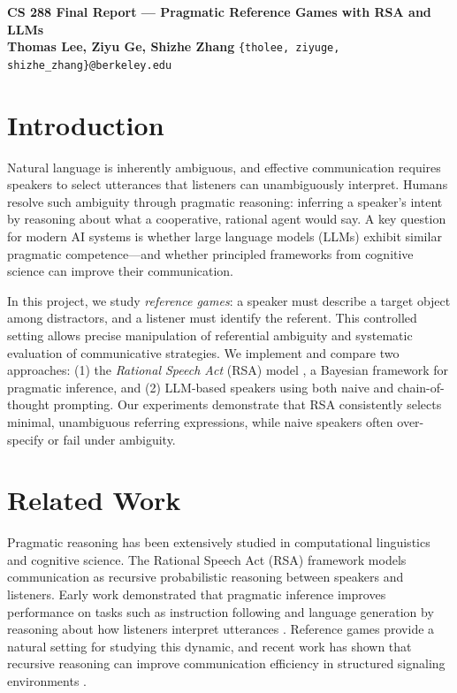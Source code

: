 \documentclass[10pt]{article}
\begin{document}
\begin{center}
    \textbf{\Large CS 288 Final Report --- Pragmatic Reference Games with RSA and LLMs} \\[2pt]
    \textbf{Thomas Lee, Ziyu Ge, Shizhe Zhang} \quad
    \texttt{\{tholee, ziyuge, shizhe\_zhang\}@berkeley.edu}
    \vspace{-0.1cm}
\end{center}

\section{Introduction}

Natural language is inherently ambiguous, and effective communication requires speakers to select utterances that listeners can unambiguously interpret. Humans resolve such ambiguity through pragmatic reasoning: inferring a speaker's intent by reasoning about what a cooperative, rational agent would say. A key question for modern AI systems is whether large language models (LLMs) exhibit similar pragmatic competence---and whether principled frameworks from cognitive science can improve their communication.

In this project, we study \emph{reference games}: a speaker must describe a target object among distractors, and a listener must identify the referent. This controlled setting allows precise manipulation of referential ambiguity and systematic evaluation of communicative strategies. We implement and compare two approaches: (1) the \emph{Rational Speech Act} (RSA) model \cite{fried2017pragmatic}, a Bayesian framework for pragmatic inference, and (2) LLM-based speakers using both naive and chain-of-thought prompting. Our experiments demonstrate that RSA consistently selects minimal, unambiguous referring expressions, while naive speakers often over-specify or fail under ambiguity.

\section{Related Work}

\indent Pragmatic reasoning has been extensively studied in computational linguistics and cognitive science. The Rational Speech Act (RSA) framework models communication as recursive probabilistic reasoning between speakers and listeners. Early work demonstrated that pragmatic inference improves performance on tasks such as instruction following and language generation by reasoning about how listeners interpret utterances \cite{fried2017pragmatic, cohn2018pragmatically}. Reference games provide a natural setting for studying this dynamic, and recent work has shown that recursive reasoning can improve communication efficiency in structured signaling environments \cite{carlsson2023structured}.
\end{document}
